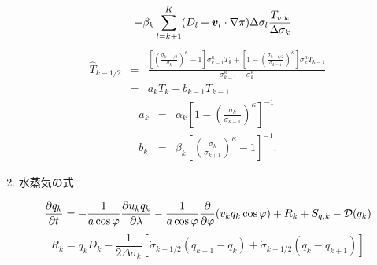 \begin{enumerate}
\begin{eqnarray}
    &   & - \beta_k \sum_{l=k+1}^{K} 
                           ( D_l + \Dvect{v}_l \cdot \nabla \pi )
                            \Delta  \sigma_l 
                            \frac{T_{v,k}}{\Delta \sigma_k} 
\end{eqnarray}
%
\begin{eqnarray} 
  \hat{T}_{k-1/2}
 &  = & \frac{ \left[ \left( \frac{ \sigma_{k-1/2} }
                               { \sigma_k } \right)^{\kappa}
                  - 1 \right] \sigma_{k-1}^{\kappa} T_k 
          + \left[ 1- 
                   \left( \frac{ \sigma_{k-1/2} }
                               { \sigma_{k-1} } \right)^{\kappa}
                      \right] \sigma_k^{\kappa} T_{k-1}         }
          { \sigma_{k-1}^{\kappa} - \sigma_k^{\kappa}           } \\
 &  = & a_k T_k + b_{k-1} T_{k-1}
\end{eqnarray}
%
\begin{eqnarray}
  \label{温度補間係数}
  a_k & = & \alpha_k 
              \left[ 1- \left( \frac{ \sigma_k }{ \sigma_{k-1} }
                        \right)^{\kappa} \right]^{-1}   \\
  b_k & = & \beta_k 
              \left[ \left( \frac{ \sigma_k }{ \sigma_{k+1} } 
                     \right)^{\kappa} - 1 \right]^{-1} .  
\end{eqnarray}

\item 水蒸気の式

\begin{equation}
  \label{q結局}
  \frac{\partial q_k}{\partial t}
      =   - \frac{1}{a\cos\varphi} 
               \frac{\partial u_k q_k}{\partial \lambda}
          - \frac{1}{a\cos\varphi}
               \frac{\partial }{\partial \varphi} ( v_k q_k\cos\varphi)
          + R_k 
          + S_{q,k}
          - {\cal D}(q_k) 
\end{equation}
%
\begin{equation}
R_k  =  q_k D_k 
       - \frac{1}{2 \Delta \sigma_k} 
             [   \dot{\sigma}_{k-1/2} ( q_{k-1} - q_k   )
               + \dot{\sigma}_{k+1/2} ( q_k   - q_{k+1} ) ]
\end{equation}

\end{enumerate}
